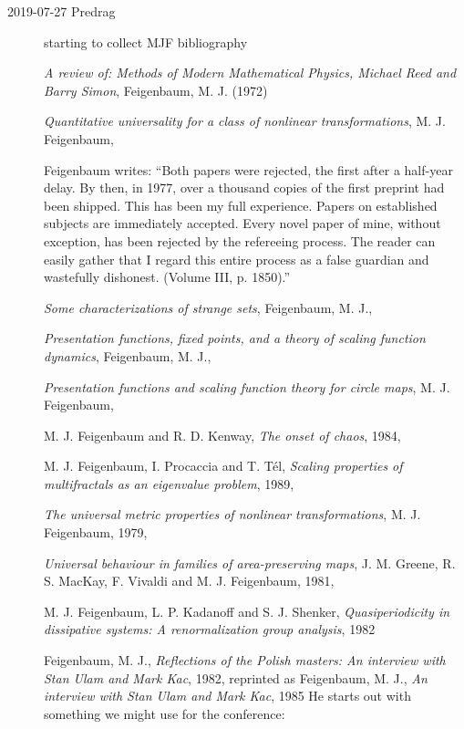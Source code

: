 \begin{description}
\item[2019-07-27 Predrag]
starting to collect MJF bibliography

{\em A review of:
{Methods of Modern Mathematical Physics, Michael Reed and Barry Simon}},
{Feigenbaum, M. J.} (1972)

{\em Quantitative universality for a class of nonlinear transformations},
{M. J. Feigenbaum},

Feigenbaum writes:
``Both papers were rejected, the first after a half-year delay. By then,
in 1977, over a thousand  copies  of  the  first  preprint  had  been
shipped.  This  has  been  my  full  experience. Papers on established
subjects are immediately accepted. Every novel paper of mine, without
exception, has been rejected by the refereeing process. The reader  can
easily  gather  that  I  regard  this  entire  process  as  a  false
guardian  and  wastefully dishonest. (Volume III, p.
1850).''

{\em Some characterizations of strange sets},
{Feigenbaum, M. J.},

{\em Presentation functions, fixed points, and a theory of scaling function dynamics},
{Feigenbaum, M. J.},

{\em Presentation functions and scaling function theory for circle maps},
{M. J. Feigenbaum},

{M. J. Feigenbaum and R. D. Kenway},
{\em The onset of chaos},
{1984},

{M. J. Feigenbaum, I. Procaccia and T. T{\'e}l},
  {\em Scaling properties of multifractals as an eigenvalue problem},
{1989},

{\em The universal metric properties of nonlinear transformations},
{M. J. Feigenbaum},
{1979},

{\em Universal behaviour in families of area-preserving maps},
{J. M. Greene, R. S. MacKay, F. Vivaldi and M. J. Feigenbaum},
{1981},

{M. J. Feigenbaum, L. P. Kadanoff and S. J. Shenker},
  {\em Quasiperiodicity in dissipative systems: {A} renormalization group analysis},
{1982}

{Feigenbaum, M. J.},
{\em Reflections of the {Polish} masters: {An} interview with {Stan Ulam} and {Mark Kac}},
{1982},
reprinted as
{Feigenbaum, M. J.},
  {\em An interview with {Stan Ulam} and {Mark Kac}},
  {1985}
He starts out with something we might use for the conference:


\end{description}
